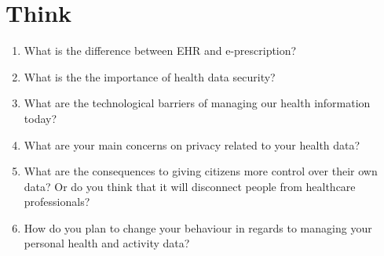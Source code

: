\documentclass[10pt, twoside]{article}   	%
\begin{document}
\section{Think}
\renewcommand{\labelenumii}{\alph{enumii}}
      \begin{enumerate}
       \item  What is the difference between EHR and e-prescription?
        \item  What is the the importance of health data security?
        \item What are the technological barriers of managing our health information today?
        \item What are your main concerns on privacy related to your health data?
        \item What are the consequences to giving citizens more control over their own data? Or do you think that it will disconnect people from healthcare professionals?
        \item How do you plan to change your behaviour in regards to managing your personal health and activity data?

      \end {enumerate}
\end{document}
